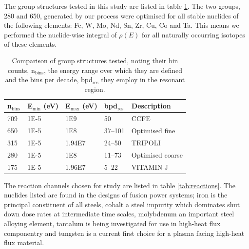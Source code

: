 The group structures tested in this study are listed in table \ref{tab:groups}. The two groups, 280 and 650, generated by our process were optimised for all stable nuclides of the following elements: Fe, W, Mo, Nd, Sn, Zr, Cu, Co and Ta. This means we performed the nuclide-wise integral of $\rho(E)$ for all naturally occurring isotopes of these elements. 

\begin{table}[H]
  \centering
  \begin{tabular}{lllll}
    \toprule
    n$_\mathrm{bins}$ & E$_\mathrm{min}$ (eV) & E$_\mathrm{max}$ (eV) & bpd$_\mathrm{res}$ & Description \\ 
    \midrule
    709 & 1E-5 & 1E9 & 50 & CCFE \\
    650 & 1E-5 & 1E8 & 37--101 & Optimised fine \\
    315 & 1E-5 & 1.94E7 & 24--50 & TRIPOLI  \\
    280 & 1E-5 & 1E8 & 11--73 & Optimised coarse \\ 
    175 & 1E-5 & 1.96E7 & 5--22 & VITAMIN-J \\
    \bottomrule
  \end{tabular}
  \caption{Comparison of group structures tested, noting their bin counts, n$_\mathrm{bins}$, the energy range over which they are defined and the bins per decade, bpd$_\mathrm{res}$ they employ in the resonant region.}
  \label{tab:groups}
\end{table}

The reaction channels chosen for study are listed in table \ref{tab:reactions}. The nuclides listed are found in the designs of fusion power systems; iron is the principal constituent of all steels, cobalt a steel impurity which dominates shut down dose rates at intermediate time scales, molybdenum an important steel alloying element, tantalum is being investigated for use in high-heat flux componentry and tungsten is a current first choice for a plasma facing high-heat flux material.


